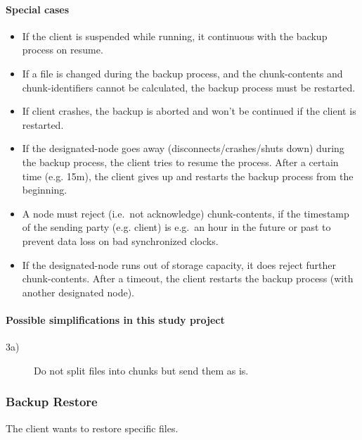 \paragraph{Special cases}
\begin{itemize}
    \item If the \gls{client} is suspended while running, it continuous with the backup process on resume. %
    \item If a \gls{file} is changed during the backup process, and the \glspl{chunk-content} and \glspl{chunk-identifier} cannot be calculated, the backup process must be restarted. %
    \item If \gls{client} crashes, the backup is aborted and won't be continued if the \gls{client} is restarted.
    \item If the \gls{designated-node} goes away (disconnects/crashes/shuts down) during the backup process, the \gls{client} tries to resume the process. After a certain time (e.g. 15m), the \gls{client} gives up and restarts the backup process from the beginning.
    \item A \gls{node} must reject (i.e.\ not acknowledge) \glspl{chunk-content}, if the timestamp of the sending party (e.g. \gls{client}) is e.g.\ an hour in the future or past to prevent data loss on bad synchronized clocks.
    \item If the \gls{designated-node} runs out of storage capacity, it does reject further \glspl{chunk-content}. After a timeout, the client restarts the backup process (with another designated node).
\end{itemize}

\paragraph{Possible simplifications in this study project}
\begin{description}
    \item[3a)] Do not split \glspl{file} into \glspl{chunk} but send them as is.
\end{description}

\subsubsection{Backup Restore}\label{sec:scenario-backup-restore}
The \gls{client} wants to restore specific \glspl{file}.

